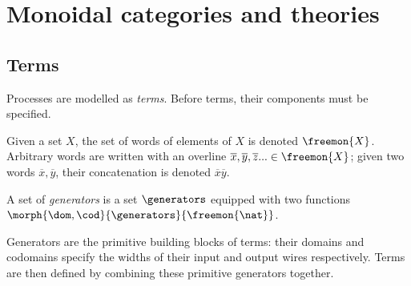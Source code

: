 \chapter{Monoidal categories and theories}

\section{Terms}

Processes are modelled as \emph{terms}.
Before terms, their components must be specified.

\begin{notation}[Words]
    Given a set \(X\), the set of words of elements of \(X\) is denoted
    \(\freemon{X}\).
    Arbitrary words are written with an overline \(
        \overline{x}, \overline{y}, \overline{z}... \in \freemon{X}
    \); given two words \(\overline{x}, \overline{y}\), their concatenation is
    denoted \(\overline{x}\overline{y}\).
\end{notation}

\begin{definition}[Generators]
    A set of \emph{generators} is a set \(\generators\) equipped with two
    functions \(\morph{\dom,\cod}{\generators}{\freemon{\nat}}\).
\end{definition}

Generators are the primitive building blocks of terms: their domains and
codomains specify the widths of their input and output wires respectively.
Terms are then defined by combining these primitive generators together.


